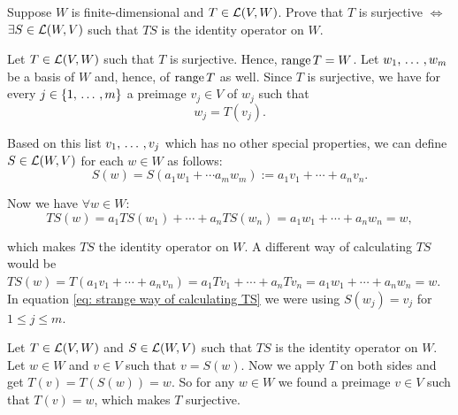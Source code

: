 \begin{xrcs}
  Suppose $W$ is finite-dimensional and $T \in \mathcal{L} (V,W)$. Prove that $T$ is surjective $\iff$ $\exists S \in \mathcal{L} (W,V)$ such that $TS$ is the identity operator on $W$.

  \begin{xprf}
    \Rightarrowdirection Let $T \in \mathcal{L} (V,W)$ such that $T$ is surjective. Hence, $\operatorname{range} T = W$. Let $w_1, {\, \ldots \,\,}, w_m$ be a basis of $W$ and, hence, of $\operatorname{range} T$ as well. Since $T$ is surjective, we have for every $j \in \{1, {\, \ldots \,\,}, m\}$ a preimage $v_j \in V$ of $w_j$ such that
    \begin{equation}
      w_j = T(v_j).
    \end{equation}

    Based on this list $v_1, {\, \ldots \,\,}, v_j$ which has no other special properties, we can define $S \in \mathcal{L} (W,V)$ for each $w \in W$ as follows:
    \begin{equation}
      S(w) = S(a_1 w_1 + \cdots a_m w_m) := a_1 v_1 + \cdots + a_n v_n.
    \end{equation}

    Now we have $\forall w \in W$:
    \begin{equation}
      \label{eq: strange way of calculating TS}
      TS(w) = a_1 TS(w_1) + \cdots +a_n TS (w_n) = a_1 w_1 + \cdots + a_n w_n = w,
    \end{equation}

    which makes $TS$ the identity operator on $W$. A different way of calculating $TS$ would be $TS(w) = T(a_1 v_1 + \cdots + a_n v_n) = a_1 T v_1 + \cdots + a_n T v_n = a_1 w_1 + \cdots + a_n w_n = w$. In equation \eqref{eq: strange way of calculating TS} we were using $S(w_j) = v_j$ for $1 \leq j \leq m$.

    \Leftarrowdirection Let $T \in \mathcal{L} (V,W)$ and $S \in \mathcal{L}(W,V)$ such that $TS$ is the identity operator on $W$. Let $w \in W$ and $v \in V$ such that $v=S(w)$. Now we apply $T$ on both sides and get $T(v) = T(S(w)) = w$. So for any $w \in W$ we found a preimage $v \in V$ such that $T(v) = w$, which makes $T$ surjective.
  \end{xprf}
\end{xrcs}


